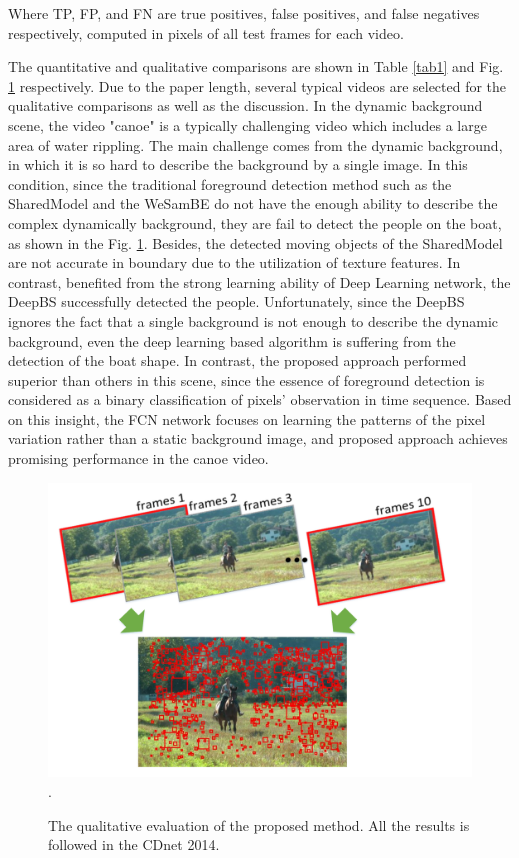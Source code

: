 \documentclass[journal]{IEEEtran}
\newcommand{\reffig}[1]{Fig. \ref{#1}}
\newcommand{\reftab}[1]{Table \ref{#1}}
\begin{document}
Where TP, FP, and FN are true positives, false positives, and false negatives respectively, computed in pixels of all test frames for each video. 


The quantitative and qualitative comparisons are shown in \reftab{tab1} and  \reffig{results_chart} respectively. 
Due to the paper length, several typical videos are selected for the qualitative comparisons as well as the discussion. 
In the dynamic background scene, the video "canoe" is a typically challenging video which includes a large area of water rippling. 
The main challenge comes from the dynamic background, in which it is so hard to describe the background by a single image. 
In this condition, since the traditional foreground detection method such as the SharedModel and the WeSamBE do not have the enough ability to describe the complex dynamically background, they are fail to detect the people on the boat, as shown in the \reffig{results_chart}. 
Besides, the detected moving objects of the SharedModel are not accurate in boundary due to the utilization of texture features. 
In contrast, benefited from the strong learning ability of Deep Learning network, the DeepBS successfully detected the people. 
Unfortunately, since the DeepBS ignores the fact that a single background is not enough to describe the dynamic background, even the deep learning based algorithm is suffering from the detection of the boat shape. 
In contrast, the proposed approach performed superior than others in this scene, since the essence of foreground detection is considered as a binary classification of pixels' observation in time sequence. 
Based on this insight, the FCN network focuses on learning the patterns of the pixel variation rather than a static background image, and proposed approach achieves promising performance in the canoe video.

\begin{figure}[!t]	\centering
    \includegraphics[width=\textwidth]{figure/fig3}
\DeclareGraphicsExtensions.
    \caption{The qualitative evaluation of the proposed method. All the results is followed in the CDnet 2014.}
    \label{results_chart}
\end{figure}
\end{document}
